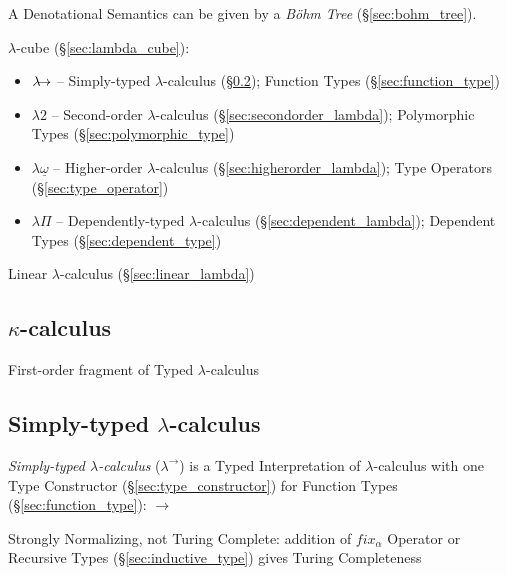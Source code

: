 A Denotational Semantics can be given by a \emph{B\"ohm Tree}
(\S\ref{sec:bohm_tree}).

$\lambda$-cube (\S\ref{sec:lambda_cube}):
\begin{itemize}
  \item $\lambda\kern-5pt\rightarrow$ -- Simply-typed
    $\lambda$-calculus (\S\ref{sec:simply_typed}); Function Types
    (\S\ref{sec:function_type})
  \item $\lambda2$ -- Second-order $\lambda$-calculus
    (\S\ref{sec:secondorder_lambda}); Polymorphic Types
    (\S\ref{sec:polymorphic_type})
  \item $\lambda\underline{\omega}$ -- Higher-order $\lambda$-calculus
    (\S\ref{sec:higherorder_lambda}); Type Operators
    (\S\ref{sec:type_operator})
  \item $\lambda\Pi$ -- Dependently-typed $\lambda$-calculus
    (\S\ref{sec:dependent_lambda}); Dependent Types
    (\S\ref{sec:dependent_type})
\end{itemize}

Linear $\lambda$-calculus (\S\ref{sec:linear_lambda})



\subsection{$\kappa$-calculus}\label{sec:kappa_calculus}

First-order fragment of Typed $\lambda$-calculus



\subsection{Simply-typed $\lambda$-calculus}\label{sec:simply_typed}

\emph{Simply-typed $\lambda$-calculus} ($\lambda^\rightarrow$) is a
Typed Interpretation of $\lambda$-calculus with one Type Constructor
(\S\ref{sec:type_constructor}) for Function Types
(\S\ref{sec:function_type}): $\rightarrow$

Strongly Normalizing, not Turing Complete: addition of $fix_\alpha$
Operator or Recursive Types (\S\ref{sec:inductive_type}) gives
Turing Completeness

